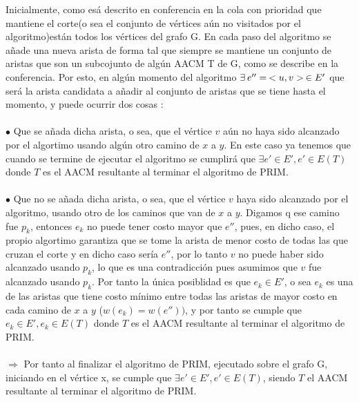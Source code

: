 \documentclass{article}
\begin{document}
    Inicialmente, como es\'a descrito en conferencia en la cola con prioridad que mantiene el corte(o sea el conjunto de v\'ertices a\'un no visitados por el algoritmo)est\'an todos los 
    v\'ertices del grafo G. En cada paso del algoritmo se a\~nade una nueva arista de forma tal que siempre se mantiene un conjunto de aristas que son un subcojunto de alg\'un AACM T de G,
    como se describe en la conferencia. Por esto, en alg\'un momento del algoritmo $\exists\hspace{0.2em} e'' = \hspace{0.2em}<u,v>\hspace{0.2em} \in E'$ que ser\'a la arista candidata a 
    a\~nadir al conjunto de aristas que se tiene hasta el momento, y puede ocurrir dos cosas :\\\\
    
    $\bullet$ Que se a\~nada dicha arista, o sea, que el v\'ertice $v$ a\'un no haya sido alcanzado por el algortimo usando alg\'un otro camino de $x$ a $y$. En este caso ya tenemos que cuando 
    se termine de ejecutar el algoritmo se cumplir\'a que $\exists e' \in E', e' \in E(T)$ donde $T$ es el AACM resultante al terminar el algoritmo de PRIM.\\\\

    $\bullet$ Que no se a\~nada dicha arista, o sea, que el v\'ertice $v$ haya sido alcanzado por el algoritmo, usando otro de los caminos que van de $x$ a $y$.
    Digamos q ese camino fue $p_k$, entonces $e_k$ no puede tener costo mayor que $e''$, pues, en dicho caso, el propio algortimo garantiza que se tome la arista de menor costo
    de todas las que cruzan el corte y en dicho caso ser\'ia $e''$, por lo tanto $v$ no puede haber sido alcanzado usando $p_k$, lo que es una contradicci\'on pues asumimos que $v$
    fue alcanzado usando $p_k$. Por tanto la \'unica posiblidad es que $e_k \in E'$, o sea $e_k$ es una de las aristas que tiene costo m\'inimo entre todas las aristas
    de mayor costo en cada camino de $x$ a $y$ ($w(e_k) = w(e''))$, y por tanto se cumple que $e_k \in E', e_k \in E(T)$ donde $T$ es el AACM resultante al terminar el algoritmo de PRIM.\\\\

    $\Rightarrow$ Por tanto al finalizar el algoritmo de PRIM, ejecutado sobre  el grafo G, iniciando en el v\'ertice x, se cumple que 
    $\exists e' \in E', e' \in E(T)$, siendo $T$ el AACM resultante al terminar el algoritmo de PRIM.\\\\
\end{document}
